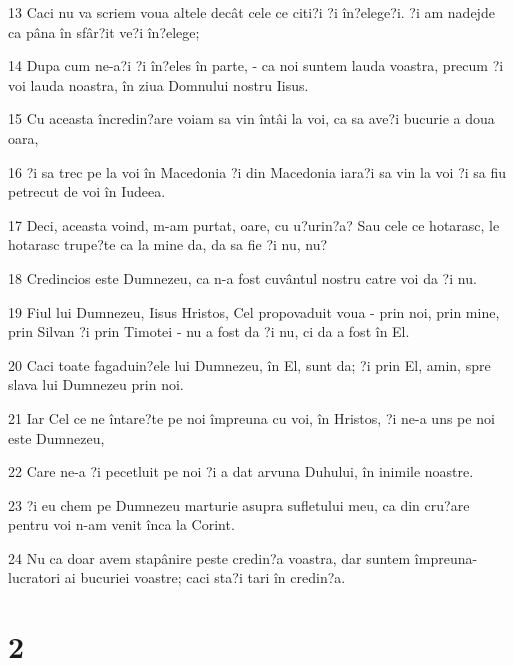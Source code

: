 \par 13 Caci nu va scriem voua altele decât cele ce citi?i ?i în?elege?i. ?i am nadejde ca pâna în sfâr?it ve?i în?elege;
\par 14 Dupa cum ne-a?i ?i în?eles în parte, - ca noi suntem lauda voastra, precum ?i voi lauda noastra, în ziua Domnului nostru Iisus.
\par 15 Cu aceasta încredin?are voiam sa vin întâi la voi, ca sa ave?i bucurie a doua oara,
\par 16 ?i sa trec pe la voi în Macedonia ?i din Macedonia iara?i sa vin la voi ?i sa fiu petrecut de voi în Iudeea.
\par 17 Deci, aceasta voind, m-am purtat, oare, cu u?urin?a? Sau cele ce hotarasc, le hotarasc trupe?te ca la mine da, da sa fie ?i nu, nu?
\par 18 Credincios este Dumnezeu, ca n-a fost cuvântul nostru catre voi da ?i nu.
\par 19 Fiul lui Dumnezeu, Iisus Hristos, Cel propovaduit voua - prin noi, prin mine, prin Silvan ?i prin Timotei - nu a fost da ?i nu, ci da a fost în El.
\par 20 Caci toate fagaduin?ele lui Dumnezeu, în El, sunt da; ?i prin El, amin, spre slava lui Dumnezeu prin noi.
\par 21 Iar Cel ce ne întare?te pe noi împreuna cu voi, în Hristos, ?i ne-a uns pe noi este Dumnezeu,
\par 22 Care ne-a ?i pecetluit pe noi ?i a dat arvuna Duhului, în inimile noastre.
\par 23 ?i eu chem pe Dumnezeu marturie asupra sufletului meu, ca din cru?are pentru voi n-am venit înca la Corint.
\par 24 Nu ca doar avem stapânire peste credin?a voastra, dar suntem împreuna-lucratori ai bucuriei voastre; caci sta?i tari în credin?a.

\chapter{2}

